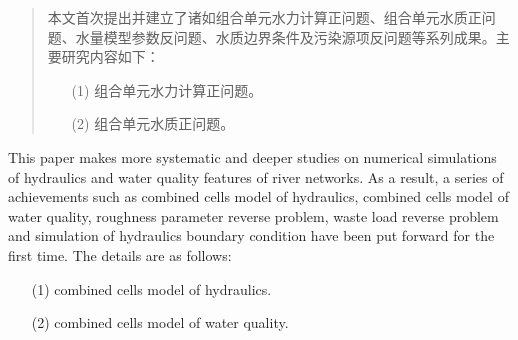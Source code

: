 
\begin{abstract}
	\linespread{1.5}
	本文首次提出并建立了诸如组合单元水力计算正问题、组合单元水质正问题、水量模型参数反问题、水质边界条件及污染源项反问题等系列成果。主要研究内容如下：
\begin{enumerate}
	\item[(1)] 组合单元水力计算正问题。
	\item[(2)] 组合单元水质正问题。
\end{enumerate}


\end{abstract}

\begin{enabstract}
	\linespread{1.5}
	This paper makes more systematic and deeper studies on numerical simulations of hydraulics and water quality features of river networks. As a result, a series of achievements such as combined cells model of hydraulics, combined cells model of water quality, roughness parameter reverse problem, waste load reverse problem and simulation of hydraulics boundary condition have been put forward for the first time. The details are as follows:

\begin{enumerate}
\item[(1)] combined cells model of hydraulics.
\item[(2)] combined cells model of water quality.
\end{enumerate}  
 

\end{enabstract}
